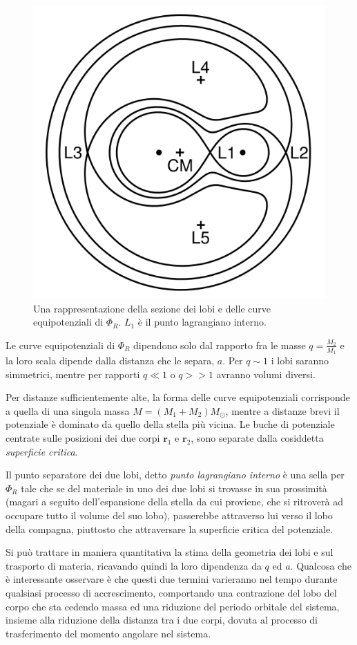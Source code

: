 \documentclass[a4paperbi]{article}
\begin{document}
	\begin{figure}[H]
		\centering
		\includegraphics[width=0.6\linewidth]{RocheEquipotential}
		\caption{Una rappresentazione della sezione dei lobi e delle curve equipotenziali di $\Phi_R$. $L_1$ è il punto lagrangiano interno.}
		\label{fig:rocheequipotential}
	\end{figure}
	
	Le curve equipotenziali di $\Phi_R$ dipendono solo dal rapporto fra le masse $q=\frac{M_2}{M_1}$ e la loro scala dipende dalla distanza che le separa, $a$. Per $q\sim1$ i lobi saranno simmetrici, mentre per rapporti $q\ll1$ o $q>>1$ avranno volumi diversi.
	
	Per distanze sufficientemente alte, la forma delle curve equipotenziali corrisponde a quella di una singola massa $M=(M_1+M_2)M_\odot$, mentre a distanze brevi il potenziale è dominato da quello della stella più vicina. Le buche di potenziale centrate sulle posizioni dei due corpi $\textbf{r}_1$ e $\textbf{r}_2$, sono separate dalla cosiddetta \textit{superficie critica}.
	
	Il punto separatore dei due lobi, detto \textit{punto lagrangiano interno} è una sella per $\Phi_R$ tale che se del materiale in uno dei due lobi si trovasse in sua prossimità (magari a seguito dell'espansione della stella da cui proviene, che si ritroverà ad occupare tutto il volume del suo lobo), passerebbe attraverso lui verso il lobo della compagna, piuttosto che attraversare la superficie critica del potenziale.
	
	Si può trattare in maniera quantitativa la stima della geometria dei lobi e sul trasporto di materia, ricavando quindi la loro dipendenza da $q$ ed $a$. Qualcosa che è interessante osservare è che questi due termini varieranno nel tempo durante qualsiasi processo di accrescimento, comportando una contrazione del lobo del corpo che sta cedendo massa ed una riduzione del periodo orbitale del sistema, insieme alla riduzione della distanza tra i due corpi, dovuta al processo di trasferimento del momento angolare nel sistema.
	
\end{document}
